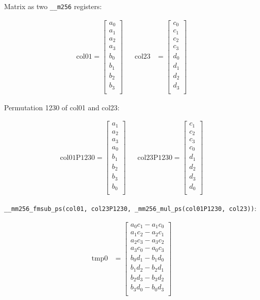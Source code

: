 \documentclass[]{scrartcl}
\begin{document}
Matrix as two \texttt{__m256} registers:

\begin{align*}
\mathrm{col01} 
=
\begin{bmatrix}
a_0\\
a_1\\
a_2\\
a_3\\
b_0\\
b_1\\
b_2\\
b_3\\
\end{bmatrix}
&&
\mathrm{col23} 
&=
\begin{bmatrix}
c_0\\
c_1\\
c_2\\
c_3\\
d_0\\
d_1\\
d_2\\
d_3\\
\end{bmatrix}
\end{align*}

Permutation 1230 of col01 and col23:

\begin{align*}
\mathrm{col01P1230} 
=
\begin{bmatrix}
a_1\\
a_2\\
a_3\\
a_0\\
b_1\\
b_2\\
b_3\\
b_0\\
\end{bmatrix}
&&
\mathrm{col23P1230} 
=
\begin{bmatrix}
c_1\\
c_2\\
c_3\\
c_0\\
d_1\\
d_2\\
d_3\\
d_0\\
\end{bmatrix}
\end{align*}

\texttt{__mm256_fmsub_ps(col01, col23P1230, _mm256_mul_ps(col01P1230, col23))}:

\begin{align*}
\mathrm{tmp0} 
&=
\begin{bmatrix}
a_0c_1 - a_1c_0\\
a_1c_2 - a_2c_1\\
a_2c_3 - a_3c_2\\
a_3c_0 - a_0c_3\\
b_0d_1 - b_1d_0\\
b_1d_2 - b_2d_1\\
b_2d_3 - b_3d_2\\
b_3d_0 - b_0d_3\\
\end{bmatrix}
\end{align*}
\end{document}
